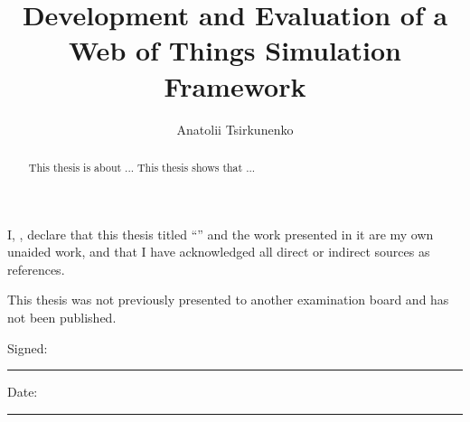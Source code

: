 \documentclass[%
    ]{\PathToTumTemplate/thesis/tum_thesis}
\title{Development and Evaluation of a Web of Things Simulation Framework}                          %
\author{Anatolii Tsirkunenko}                         %
\begin{document}
\frontmatter

\maketitle

\newcommand{\thecolophon}{  
    \begin{colophon}
        \vspace*{1cm}     
        \begin{minipage}{0.5\textwidth}\begin{flushleft}
        This thesis was typeset using the XeTeX{} 
        typesetting system developed by Jonathan Kew. 
        \end{flushleft}
        \end{minipage}
    \end{colophon}
}


\begin{authordecl}
    \noindent I, \theauthor, declare that this thesis titled
    ``\thetitle'' and the work presented in it are my own unaided
    work, and that I have acknowledged all direct or indirect sources as
    references.

    This thesis was not previously presented to another examination board
    and has not been published.

    \vspace{2em}

    \noindent Signed:\\\vspace{1em}
    \noindent\rule[0.5em]{25em}{0.5pt} %
     
    \noindent Date:\\\vspace{1em}
    \noindent\rule[0.5em]{25em}{0.5pt} %
    \rmfamily
\end{authordecl}
\cleardoublepage


\begin{abstract}
    This thesis is about ...
    This thesis shows that ...
\end{abstract}



\setcounter{tocdepth}{1}
\tableofcontents



\end{document}
